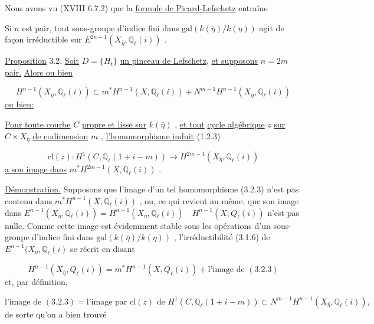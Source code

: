 Nous avons vu (XVIII 6.7.2) que la \underline{formule de Picard-Lefschetz} entraîne

Si $n$ est pair, tout sous-groupe d'indice fini dans $\mathrm{gal}(k(\bar{\eta})/k(\eta))$ agit de façon irréductible sur $E^{2n-1}(X_{\bar{\eta}},\mathbb{Q}_{\ell}(i))$ .

\underline{Proposition} 3.2. \quad \underline{Soit} $D = \{H_{t}\}$ \underline{un pinceau de Lefschetz}, \underline{et supposons} $n = 2m$ \underline{pair.} \underline{Alors ou bien} 



\begin{equation}\tag{3.2.1}
 H^{n-1}(X_{\bar{\eta}},\mathbb{Q}_{\ell}(i)) \subset m^{*}H^{n-1}(X,\mathbb{Q}_{\ell}(i)) + N^{m-1}H^{n-1}(X_{\bar{\eta}},\mathbb{Q}_{\ell}(i))
\end{equation}
\underline{ou bien:}

\underline{Pour toute courbe} $C$ \underline{propre et lisse sur} $k(\bar{\eta})$ , \underline{et tout} \underline{cycle algébrique} $z$ \underline{sur} $C \times X_{\bar{\eta}}$ \underline{de codimension} $m$ , \underline{l'homomorphisme induit} (1.2.3)

\begin{equation}\tag{3.2.3}
\mathrm{cl}(z) : H^{1}(C, \mathbb{Q}_{\ell}(1+i-m)) \longrightarrow H^{2m-1}(X_{\bar{\eta}},\mathbb{Q}_{\ell}(i))
\end{equation}
\underline{a son image dans} $m^{*}H^{2m-1}(X,\mathbb{Q}_{\ell}(i))$ .

\underline{Démonstration.} Supposons que l'image d'un tel homomorphisme (3.2.3) n'est pas contenu dans $m^{*}H^{n-1}(X,\mathbb{Q}_{\ell}(i))$ , ou, ce qui revient au même, que son image dans $E^{n-1}(X_{\bar{\eta}},\mathbb{Q}_{\ell}(i)) = H^{n-1}(X_{\bar{\eta}},\mathbb{Q}_{\ell}(i)) \quad H^{n-1}(X,Q_{\ell}(i))$ n'est pas nulle. Comme cette image est évidemment stable sous les opérations d'un sous-groupe d'indice fini dans $\mathrm{gal}(k(\bar{\eta})/k(\eta))$ , l'irréductibilité (3.1.6) de $E^{n-1}(X_{\bar{\eta}},\mathbb{Q}_{\ell}(i)$ se récrit en disant

\begin{equation*}
H^{n-1}(X_{\bar{\eta}},Q_{\ell}(i)) = m^{*}H^{n-1}(X,Q_{\ell}(i)) + \text{l'image de } (3.2.3)
\end{equation*}
et, par définition,

\begin{equation*}
\text{l'image de } (3.2.3) = \text{l'image par } \mathrm{cl}(z) \text{ de } H^{1}(C,\mathbb{Q}_{\ell}(1+i-m)) \subset N^{m-1}H^{n-1}(X_{\bar{\eta}},\mathbb{Q}_{\ell}(i)) ,
\end{equation*}
de sorte qu'on a bien trouvé

